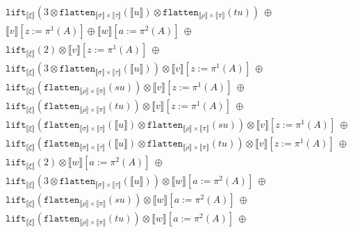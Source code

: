 \documentclass[runningheads,a4paper]{llncs}
\newcommand{\typeinterpret}[1]{\llbracket #1 \rrbracket}
\newcommand{\interpret}[1]{\llbracket #1 \rrbracket}
\newcommand{\flatten}{\mathtt{flatten}}
\newcommand{\lift}{\mathtt{lift}}
\begin{document}
\begin{itemize}
\[\begin{array}{l}
  \phantom{A}
    \lift_{\typeinterpret{\xi}}(3 \otimes \flatten_{\typeinterpret{\sigma}
    \times \typeinterpret{\tau}}(\interpret{u}) \otimes
    \flatten_{\typeinterpret{\rho} \times \typeinterpret{\pi}}(tu))\ 
    \oplus \\
  \phantom{A}
    \interpret{v}[z:=\pi^1(A)] \oplus
    \interpret{w}[a:=\pi^2(A)]\ \oplus\ \\
  \phantom{A}
    \lift_{\typeinterpret{\xi}}(2) \otimes
     \interpret{v}[z:=\pi^1(A)]
    \ \oplus \\
  \phantom{A}
    \lift_{\typeinterpret{\xi}}(3 \otimes
    \flatten_{\typeinterpret{\sigma} \times \typeinterpret{\tau}}(
    \interpret{u})) \otimes
     \interpret{v}[z:=\pi^1(A)]
    \ \oplus \\
  \phantom{A}
    \lift_{\typeinterpret{\xi}}(\flatten_{\typeinterpret{\rho} \times
    \typeinterpret{\pi}}(su)) \otimes
     \interpret{v}[z:=\pi^1(A)]
    \ \oplus\\
  \phantom{A}
    \lift_{\typeinterpret{\xi}}(\flatten_{\typeinterpret{\rho} \times
    \typeinterpret{\pi}}(tu)) \otimes
     \interpret{v}[z:=\pi^1(A)]
    \ \oplus \\
  \phantom{A}
    \lift_{\typeinterpret{\xi}}(\flatten_{\typeinterpret{\sigma} \times
    \typeinterpret{\tau}}(\interpret{u}) \otimes
    \flatten_{\typeinterpret{\rho} \times \typeinterpret{\pi}}(su))
    \otimes
     \interpret{v}[z:=\pi^1(A)]
    \ \oplus \\
  \phantom{A}
    \lift_{\typeinterpret{\xi}}(\flatten_{\typeinterpret{\sigma} \times
    \typeinterpret{\tau}}(\interpret{u}) \otimes
    \flatten_{\typeinterpret{\rho} \times \typeinterpret{\pi}}(tu))
    \otimes
     \interpret{v}[z:=\pi^1(A)]
    \ \oplus \\
  \phantom{A}
    \lift_{\typeinterpret{\xi}}(2) \otimes
    \interpret{w}[a:=\pi^2(A)]
    \ \oplus \\
  \phantom{A}
    \lift_{\typeinterpret{\xi}}(3 \otimes
    \flatten_{\typeinterpret{\sigma} \times \typeinterpret{\tau}}(
    \interpret{u})) \otimes
    \interpret{w}[a:=\pi^2(A)]
    \ \oplus \\
  \phantom{A}
    \lift_{\typeinterpret{\xi}}(\flatten_{\typeinterpret{\rho} \times
    \typeinterpret{\pi}}(su)) \otimes
    \interpret{w}[a:=\pi^2(A)]
    \ \oplus\\
  \phantom{A}
    \lift_{\typeinterpret{\xi}}(\flatten_{\typeinterpret{\rho} \times
    \typeinterpret{\pi}}(tu)) \otimes
    \interpret{w}[a:=\pi^2(A)]
    \ \oplus \\

\end{array}\]
\end{itemize}
\end{document}
